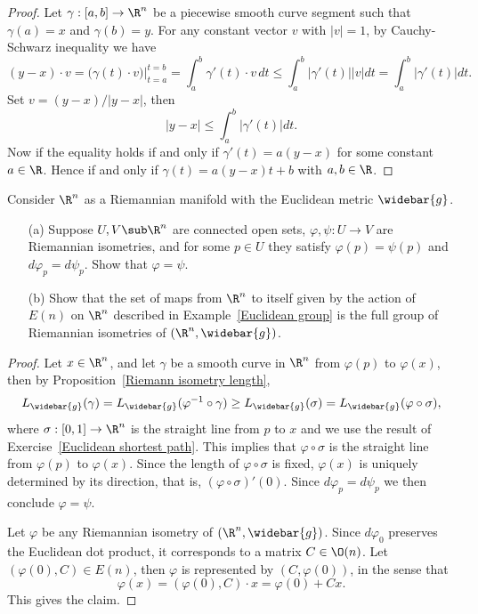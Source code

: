 \begin{proof}
Let $\gamma:[a,b]\to\R^n$ be a piecewise smooth curve segment such that $\gamma(a)=x$ and $\gamma(b)=y$. 
For any constant vector $v$ with $|v|=1$, by Cauchy-Schwarz inequality we have
\[(y-x)\cdot v=\big(\gamma(t)\cdot v\big)\Big|_{t=a}^{t=b}=\int_{a}^{b}\gamma'(t)\cdot v\,dt\leq\int_{a}^{b}|\gamma'(t)||v|dt=\int_{a}^{b}|\gamma'(t)|dt.\]
Set $v=(y-x)/|y-x|$, then
\[|y-x|\leq\int_{a}^{b}|\gamma'(t)|dt.\]
Now if the equality holds if and only if $\gamma'(t)=a(y-x)$ for some constant $a\in\R$. 
Hence if and only if $\gamma(t)=a(y-x)t+b$ with $a,b\in\R$.
\end{proof}
\begin{exercise}\label{Euclidean isometry group}
Consider $\R^n$ as a Riemannian manifold with the Euclidean metric $\widebar{g}$.
\begin{itemize}
\item[(a)] Suppose $U,V\sub\R^n$ are connected open sets, $\varphi,\psi:U\to V$ are Riemannian isometries, and for some $p\in U$ they satisfy $\varphi(p)=\psi(p)$ and $d\varphi_p=d\psi_p$. Show that $\varphi=\psi$.
\item[(b)] Show that the set of maps from $\R^n$ to itself given by the action of $E(n)$ on $\R^n$ described in Example~\ref{Euclidean group} is the full group of Riemannian isometries of $(\R^n,\widebar{g})$.
\end{itemize}
\end{exercise}
\begin{proof}
Let $x\in\R^n$, and let $\gamma$ be a smooth curve in $\R^n$ from $\varphi(p)$ to $\varphi(x)$, 
then by Proposition~\ref{Riemann isometry length},
\[L_{\widebar{g}}(\gamma)=L_{\widebar{g}}(\varphi^{-1}\circ\gamma)\geq L_{\widebar{g}}(\sigma)=L_{\widebar{g}}(\varphi\circ\sigma),\]
where $\sigma:[0,1]\to\R^n$ is the straight line from $p$ to $x$ and we use the result of Exercise~\ref{Euclidean shortest path}. 
This implies that $\varphi\circ\sigma$ is the straight line from $\varphi(p)$ to $\varphi(x)$. 
Since the length of $\varphi\circ\sigma$ is fixed, $\varphi(x)$ is uniquely determined by its 
direction, that is, $(\varphi\circ\sigma)'(0)$. Since $d\varphi_p=d\psi_p$ we then conclude 
$\varphi=\psi$.\par
Let $\varphi$ be any Riemannian isometry of $(\R^n,\widebar{g})$. Since $d\varphi_0$ preserves 
the Euclidean dot product, it corresponds to a matrix $C\in\O(n)$. Let $(\varphi(0),C)\in E(n)$, then $\varphi$ is represented by $(C,\varphi(0))$, in the sense that
\[\varphi(x)=(\varphi(0),C)\cdot x=\varphi(0)+Cx.\]
This gives the claim.
\end{proof}
